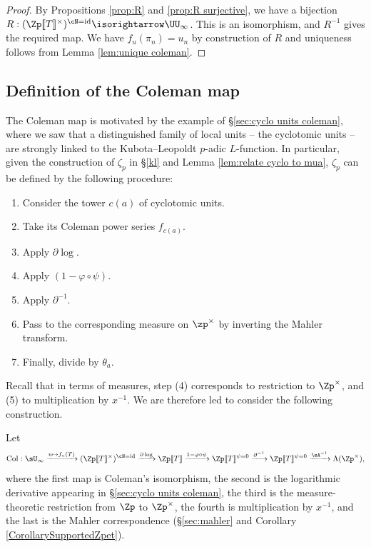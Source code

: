 \documentclass[a4paper,10pt, english, reqno]{smfart}
\newcommand{\lsem}{[\! [}
\newcommand{\rsem}{]\! ]}
\numberwithin{equation}{section}
\begin{document}
\begin{proof}
	By Propositions \ref{prop:R} and \ref{prop:R surjective}, we have a bijection $R: (\Zp\lsem T\rsem^\times)^{\cN=\mathrm{id}} \isorightarrow \UU_\infty$. This is an isomorphism, and  $R^{-1}$ gives the required map. We have $f_u(\pi_n) = u_n$ by construction of $R$ and uniqueness follows from Lemma \ref{lem:unique coleman}. 
\end{proof}





\subsection{Definition of the Coleman map} \label{sec:coleman map definition}

The Coleman map is motivated by the example of \S\ref{sec:cyclo units coleman}, where we saw that a distinguished family of local units -- the cyclotomic units -- are strongly linked to the Kubota--Leopoldt $p$-adic $L$-function. In particular, given the construction of $\zeta_p$ in \S\ref{kl} and Lemma \ref{lem:relate cyclo to mua}, $\zeta_p$ can be defined by the following procedure:
\begin{enumerate}
	\item Consider the tower $c(a)$ of cyclotomic units.
	\item Take its Coleman power series $f_{c(a)}$. 
	\item Apply $\partial\log$.
	\item Apply $(1-\varphi\circ\psi)$.
	\item Apply $\partial^{-1}$.
	\item Pass to the corresponding measure on $\zp^\times$ by inverting the Mahler transform.
	\item Finally, divide by $\theta_a$.
\end{enumerate} 
Recall that in terms of measures, step (4) corresponds to restriction to $\Zp^\times$, and (5) to multiplication by $x^{-1}$. We are therefore led to consider the following construction.
\begin{definition} \label{def:coleman map}
	Let
\[
\mathrm{Col} :	\sU_\infty \xrightarrow{u \mapsto f_u(T)} (\Zp\lsem T\rsem ^\times)^{\cN=\mathrm{id}} \xrightarrow {\partial\log} \Zp\lsem T\rsem  \xrightarrow{1-\varphi\circ\psi} \Zp\lsem T\rsem ^{\psi = 0}\xrightarrow{\partial^{-1}}\Zp\lsem T\rsem ^{\psi = 0} \xrightarrow{\sA^{-1}} \Lambda(\Zp^\times),
\]
where the first map is Coleman's isomorphism, the second is the logarithmic derivative appearing in \S\ref{sec:cyclo units coleman}, the third is the measure-theoretic restriction from $\Zp$ to $\Zp^\times$, the fourth is multiplication by $x^{-1}$, and the last is the Mahler correspondence (\S\ref{sec:mahler} and Corollary \ref{CorollarySupportedZpet}).
\end{definition}
\end{document}
